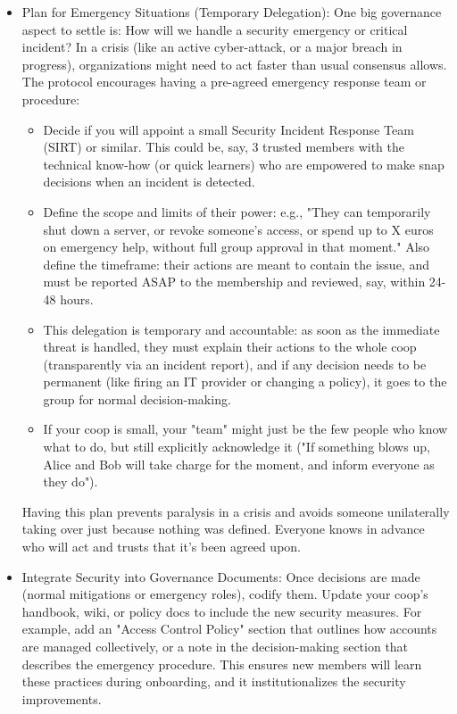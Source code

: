 \begin{itemize}
    \item Plan for Emergency Situations (Temporary Delegation): One big governance aspect to settle is: How will
    we handle a security emergency or critical incident? In a crisis (like an active cyber-attack, or a major
    breach in progress), organizations might need to act faster than usual consensus allows. The protocol encourages
    having a pre-agreed emergency response team or procedure:
        \begin{itemize}   
            \item Decide if you will appoint a small Security Incident Response Team (SIRT) or similar. This could
    be, say, 3 trusted members with the technical know-how (or quick learners) who are empowered to make snap
    decisions when an incident is detected.
            \item Define the scope and limits of their power: e.g., "They can temporarily shut down a server, or
    revoke someone's access, or spend up to X euros on emergency help, without full group approval in that
    moment." Also define the timeframe: their actions are meant to contain the issue, and must be reported ASAP to
    the membership and reviewed, say, within 24-48 hours.
            \item This delegation is temporary and accountable: as soon as the immediate threat is handled, they must
    explain their actions to the whole coop (transparently via an incident report), and if any decision needs to
    be permanent (like firing an IT provider or changing a policy), it goes to the group for normal
    decision-making.
            \item If your coop is small, your "team" might just be the few people who know what to do, but still
    explicitly acknowledge it ("If something blows up, Alice and Bob will take charge for the moment, and inform
    everyone as they do").
        \end{itemize}
    
    Having this plan prevents paralysis in a crisis and avoids someone unilaterally taking over just because
    nothing was defined. Everyone knows in advance who will act and trusts that it's been agreed upon.
    
    \item Integrate Security into Governance Documents: Once decisions are made (normal mitigations or emergency
    roles), codify them. Update your coop's handbook, wiki, or policy docs to include the new security measures.
    For example, add an "Access Control Policy" section that outlines how accounts are managed collectively, or a
    note in the decision-making section that describes the emergency procedure. This ensures new members will
    learn these practices during onboarding, and it institutionalizes the security improvements.
    

\end{itemize}
